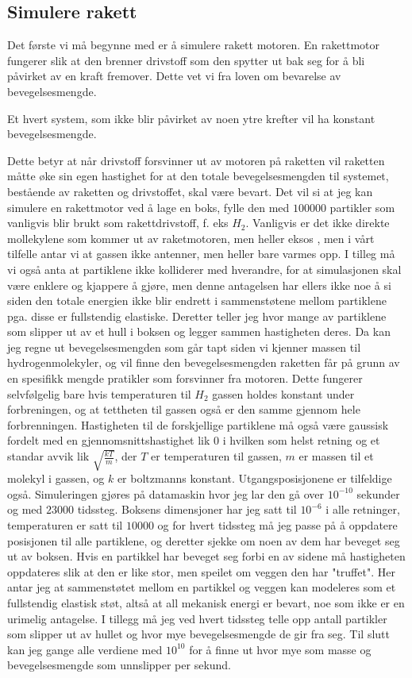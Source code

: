 \documentclass[11pt, A4paper, norsk]{report}
\begin{document}
		\subsection{Simulere rakett}
Det første vi må begynne med er å simulere rakett motoren. En rakettmotor fungerer slik at den brenner drivstoff som den spytter ut bak seg for å bli påvirket av en kraft fremover. Dette vet vi fra loven om bevarelse av bevegelsesmengde. 
			\begin{center}
Et hvert system, som ikke blir påvirket av noen ytre krefter vil ha konstant bevegelsesmengde.
			\end{center}
Dette betyr at når drivstoff forsvinner ut av motoren på raketten vil raketten måtte øke sin egen hastighet for at den totale bevegelsesmengden til systemet, bestående av raketten og drivstoffet, skal være bevart. Det vil si at jeg kan simulere en rakettmotor ved å lage en boks, fylle den med $100 000$ partikler som vanligvis blir brukt som rakettdrivstoff, f. eks $H_2$. Vanligvis er det ikke direkte mollekylene som kommer ut av raketmotoren, men heller eksos \cite{part1}, men i vårt tilfelle antar vi at gassen ikke antenner, men heller bare varmes opp. I tilleg må vi også anta at partiklene ikke kolliderer med hverandre, for at simulasjonen skal være enklere og kjappere å gjøre, men denne antagelsen har ellers ikke noe å si siden den totale energien ikke blir endrett i sammenstøtene mellom partiklene pga. disse er fullstendig elastiske. Deretter teller jeg hvor mange av partiklene som slipper ut av et hull i boksen og legger sammen hastigheten deres. Da kan jeg regne ut bevegelsesmengden som går tapt siden vi kjenner massen til hydrogenmolekyler, og vil finne den bevegelsesmengden raketten får på grunn av en spesifikk mengde pratikler som forsvinner fra motoren. Dette fungerer selvfølgelig bare hvis temperaturen til $H_2$ gassen holdes konstant under forbreningen, og at tettheten til gassen også er den samme gjennom hele forbrenningen. Hastigheten til de forskjellige partiklene må også være gaussisk fordelt med en gjennomsnittshastighet lik $0$ i hvilken som helst retning og et standar avvik lik $\sqrt{\frac{kT}{m}}$, der $T$ er temperaturen til gassen, $m$ er massen til et molekyl i gassen, og $k$ er boltzmanns konstant. Utgangsposisjonene er tilfeldige også.
Simuleringen gjøres på datamaskin hvor jeg lar den gå over $10^{-10}$ sekunder og med $23 000$ tidssteg. Boksens dimensjoner har jeg satt til $10^{-6}$ i alle retninger, temperaturen er satt til $10 000$ og for hvert tidssteg må jeg passe på å oppdatere posisjonen til alle partiklene, og deretter sjekke om noen av dem har beveget seg ut av boksen. Hvis en partikkel har beveget seg forbi en av sidene må hastigheten oppdateres slik at den er like stor, men speilet om veggen den har "truffet". Her antar jeg at sammenstøtet mellom en partikkel og veggen kan modeleres som et fullstendig elastisk støt, altså at all mekanisk energi er bevart, noe som ikke er en urimelig antagelse. I tillegg må jeg ved hvert tidssteg telle opp antall partikler som slipper ut av hullet og hvor mye bevegelsesmengde de gir fra seg. Til slutt kan jeg gange alle verdiene med $10^10$ for å finne ut hvor mye som masse og bevegelsesmengde som unnslipper per sekund.
\end{document}
